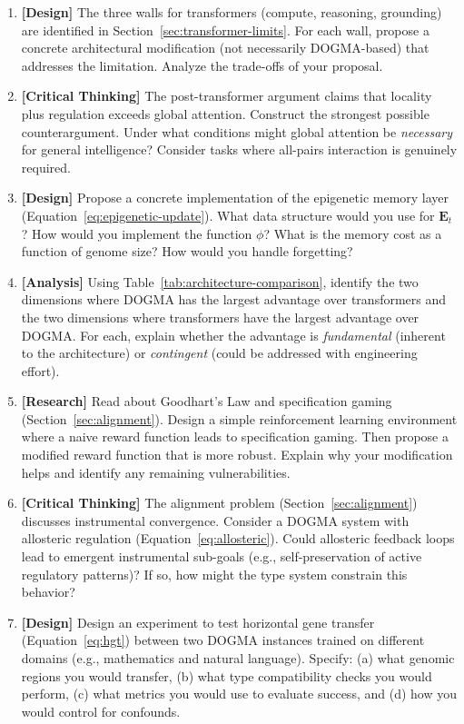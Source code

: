 \begin{enumerate}[label=\textbf{16.\arabic*.}, leftmargin=2.5em]
\item \textbf{[Design]} The three walls for transformers (compute, reasoning, grounding) are identified in Section~\ref{sec:transformer-limits}. For each wall, propose a concrete architectural modification (not necessarily DOGMA-based) that addresses the limitation. Analyze the trade-offs of your proposal.

\item \textbf{[Critical Thinking]} The post-transformer argument claims that locality plus regulation exceeds global attention. Construct the strongest possible counterargument. Under what conditions might global attention be \emph{necessary} for general intelligence? Consider tasks where all-pairs interaction is genuinely required.

\item \textbf{[Design]} Propose a concrete implementation of the epigenetic memory layer (Equation~\ref{eq:epigenetic-update}). What data structure would you use for $\mathbf{E}_t$? How would you implement the function $\phi$? What is the memory cost as a function of genome size? How would you handle forgetting?

\item \textbf{[Analysis]} Using Table~\ref{tab:architecture-comparison}, identify the two dimensions where DOGMA has the largest advantage over transformers and the two dimensions where transformers have the largest advantage over DOGMA. For each, explain whether the advantage is \emph{fundamental} (inherent to the architecture) or \emph{contingent} (could be addressed with engineering effort).

\item \textbf{[Research]} Read about Goodhart's Law and specification gaming (Section~\ref{sec:alignment}). Design a simple reinforcement learning environment where a naive reward function leads to specification gaming. Then propose a modified reward function that is more robust. Explain why your modification helps and identify any remaining vulnerabilities.

\item \textbf{[Critical Thinking]} The alignment problem (Section~\ref{sec:alignment}) discusses instrumental convergence. Consider a DOGMA system with allosteric regulation (Equation~\ref{eq:allosteric}). Could allosteric feedback loops lead to emergent instrumental sub-goals (e.g., self-preservation of active regulatory patterns)? If so, how might the type system constrain this behavior?

\item \textbf{[Design]} Design an experiment to test horizontal gene transfer (Equation~\ref{eq:hgt}) between two DOGMA instances trained on different domains (e.g., mathematics and natural language). Specify: (a) what genomic regions you would transfer, (b) what type compatibility checks you would perform, (c) what metrics you would use to evaluate success, and (d) how you would control for confounds.


\end{enumerate}
